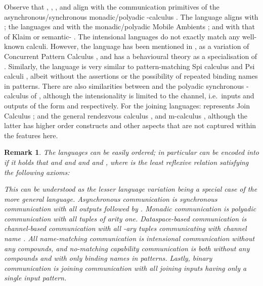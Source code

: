 \documentclass[submission,copyright,creativecommons]{eptcs}
\newtheorem{remark}[theorem]{Remark}
\begin{document}
Observe that , , , and 
align with the communication
primitives of the asynchronous/synchronous monadic/polyadic -calculus
\cite{Milner:1992:CMP:162037.162038,Milner:1992:CMP:162037.162039,milner:polyadic-tutorial}.
The language  aligns with \Linda \cite{Gel85};
the languages  and  with the monadic/polyadic Mobile Ambients \cite{DBLP:conf/fossacs/CardelliG98};
and  with that of {\sc Klaim} \cite{10.1109/32.685256} or semantic- \cite{Castagna:2008:SSP:1367144.1367262}.
The intensional languages do not exactly match any well-known calculi.
However,
the language  has been mentioned in \cite{GivenWilsonPHD}, as a variation of Concurrent Pattern Calculus \cite{GivenWilsonGorlaJay10,GivenWilsonPHD},
and has a behavioural theory as a specialisation of \cite{GivenWilsonGorla13}.
Similarly, the language  is very similar to pattern-matching Spi calculus
\cite{Haack:2006:PS:1165126.1165127}
and Psi calculi \cite{BJPV11},
albeit without the assertions or the possibility of repeated binding names in patterns.
There are also similarities between  and the polyadic synchronous -calculus of
\cite{Carbone:2003:EPP:941344.941346}, although the intensionality is limited to the
channel, i.e.~inputs and outputs of the form  and  respectively.
For the joining languages:
 represents Join Calculus \cite{Fournet_thereflexive};
and  the general rendezvous calculus \cite{Bocchi2004119},
and m-calculus \cite{DBLP:conf/popl/SchmittS03}, although the latter has higher order constructs and
other aspects that are not captured within the features here.

\begin{remark}
\label{rem:leq}
The languages  can be easily ordered; in particular
 can be encoded into
 if it holds that
 and
 and
 and
 and
, where  is the least reflexive relation satisfying the following axioms:

This can be understood as the lesser language variation being a special case of the more general language.
Asynchronous communication is synchronous communication with all outputs followed by .
Monadic communication is polyadic communication with all tuples of arity one.
Dataspace-based communication is channel-based communication with all -ary tuples communicating with channel name .
All name-matching communication is intensional communication without any compounds,
and no-matching capability communication is both without any compounds and with only binding names
in patterns.
Lastly, binary communication is joining communication with all joining inputs having only a single input pattern.
\end{remark}
\end{document}
